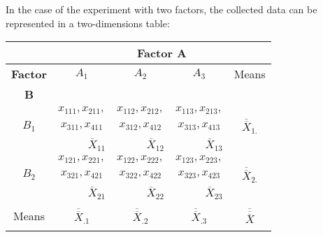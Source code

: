 \begin{frame}
  \begin{footnotesize}
    In the case of the experiment with two factors, the collected data can be represented in a two-dimensions table: \\
    \vspace*{.25cm} 
    \hspace*{.7cm}
    \begin{tabular}{|c|c|c|c|c|}
      \cline{2-5}
      \multicolumn{1}{c}{} & \multicolumn{4}{|c|}{\textbf{Factor A}}\\ \hline
      \hspace*{.2cm}\textbf{Factor}\hspace*{.2cm} & $A_1$ & $A_2$ & $A_3$ & Means\\ 
      \textbf{B} &  &  &  &    \\ \hline
      & $x_{111},x_{211},$\hspace*{.7cm} & $x_{112},x_{212},$\hspace*{.7cm} & $x_{113},x_{213},$\hspace*{.7cm} & \\
      $B_1$ & $x_{311},x_{411}$\hspace*{.7cm} & $x_{312},x_{412}$\hspace*{.7cm} & $x_{313},x_{413}$\hspace*{.7cm} & $\overline{\overline{X}}_{1.}$\\ 
      & \multicolumn{1}{|r|}{$\overline{X}_{11}$} & \multicolumn{1}{|r|}{$\overline{X}_{12}$} & \multicolumn{1}{|r|}{$\overline{X}_{13}$} &  \\ \hline
      & $x_{121},x_{221},$\hspace*{.7cm} & $x_{122},x_{222},$\hspace*{.7cm} & $x_{123},x_{223},$\hspace*{.7cm} & \\
      $B_2$ & $x_{321},x_{421}$\hspace*{.7cm} & $x_{322},x_{422}$\hspace*{.7cm} & $x_{323},x_{423}$\hspace*{.7cm} & $\overline{\overline{X}}_{2.}$\\ 
      & \multicolumn{1}{|r|}{$\overline{X}_{21}$} & \multicolumn{1}{|r|}{$\overline{X}_{22}$} & \multicolumn{1}{|r|}{$\overline{X}_{23}$} &  \\ \hline
     	& &  &  & \\
	Means & $\overline{\overline{X}}_{.1}$ & $\overline{\overline{X}}_{.2}$ & $\overline{\overline{X}}_{.3}$ & $\overline{\overline{\overline{X}}}$\\ 
	&  &  &  &  \\ \hline
    \end{tabular}   
    \vspace*{.5cm}
  \end{footnotesize}                                                                                                   
\end{frame}

